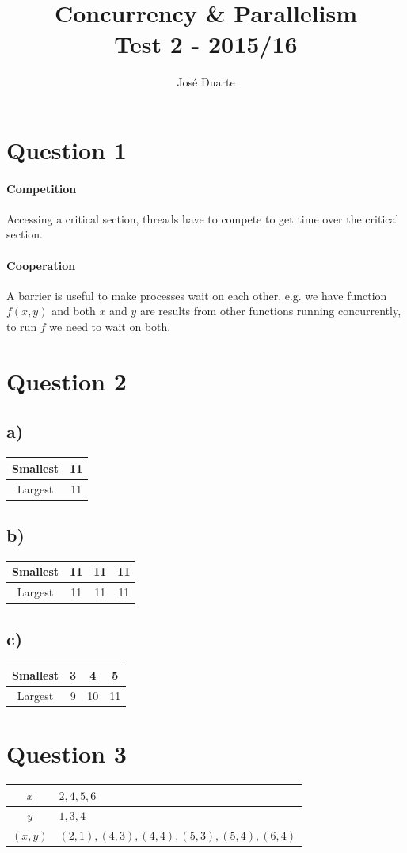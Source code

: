 \documentclass[a4paper,twocolumn]{article}
\author{José Duarte}
\title{Concurrency \& Parallelism\\Test 2 - 2015/16}
\begin{document}
\maketitle
\section{Question 1}
\paragraph{Competition}
Accessing a critical section, threads have to compete to get time over the critical section.
\paragraph{Cooperation}
A barrier is useful to make processes wait on each other,
e.g. we have function $f(x, y)$ and both $x$ and $y$ are results from other functions running concurrently,
to run $f$ we need to wait on both.
\section{Question 2}
\subsection{a)}
\begin{tabular}{c|c}
    Smallest & 11 \\
    \hline
    Largest  & 11 \\
\end{tabular}
\subsection{b)}
\begin{tabular}{c|c c c}
    Smallest & 11 & 11 & 11 \\
    \hline
    Largest  & 11 & 11 & 11 \\
\end{tabular}
\subsection{c)}
\begin{tabular}{c|c c c}
    Smallest & 3 & 4 & 5 \\
    \hline
    Largest  & 9 & 10 & 11\\
\end{tabular}
\section{Question 3}
\begin{tabular}{c | l}
    $x$ & $ 2, 4, 5, 6$ \\
    \hline
    $y$ & $1, 3, 4$ \\
    \hline
    $(x, y)$ & $(2, 1), (4, 3), (4, 4), (5, 3), (5, 4), (6, 4)$ \\
\end{tabular}
\end{document}
